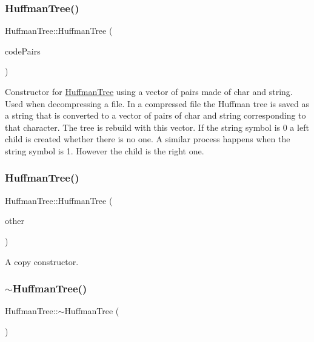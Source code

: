 \subsubsection{\texorpdfstring{Huffman\+Tree()}{HuffmanTree()}\hspace{0.1cm}{\footnotesize\ttfamily [3/4]}}
{\footnotesize\ttfamily Huffman\+Tree\+::\+Huffman\+Tree (\begin{DoxyParamCaption}\item[{std\+::vector$<$ std\+::pair$<$ char, std\+::string $>$$>$ \&}]{code\+Pairs }\end{DoxyParamCaption})\hspace{0.3cm}{\ttfamily [explicit]}}

Constructor for \hyperlink{class_huffman_tree}{Huffman\+Tree} using a vector of pairs made of char and string. Used when decompressing a file. In a compressed file the Huffman tree is saved as a string that is converted to a vector of pairs of char and string corresponding to that character. The tree is rebuild with this vector. If the string symbol is 0 a left child is created whether there is no one. A similar process happens when the string symbol is 1. However the child is the right one. \mbox{\label{class_huffman_tree_a19a9e458233f8dd7ed99252be797bbd3}} 
\subsubsection{\texorpdfstring{Huffman\+Tree()}{HuffmanTree()}\hspace{0.1cm}{\footnotesize\ttfamily [4/4]}}
{\footnotesize\ttfamily Huffman\+Tree\+::\+Huffman\+Tree (\begin{DoxyParamCaption}\item[{const \hyperlink{class_huffman_tree}{Huffman\+Tree} \&}]{other }\end{DoxyParamCaption})}

A copy constructor. \mbox{\label{class_huffman_tree_a1c39382be4e786a99a07183bbee3830d}} 
\subsubsection{\texorpdfstring{$\sim$\+Huffman\+Tree()}{~HuffmanTree()}}
{\footnotesize\ttfamily Huffman\+Tree\+::$\sim$\+Huffman\+Tree (\begin{DoxyParamCaption}{ }\end{DoxyParamCaption})}

